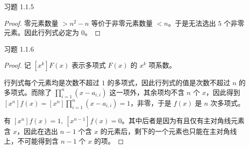 \begin{problem}
	习题 1.1.5
	\begin{proof}
		零元素数量 $> n^2 - n$ 等价于非零元素数量 $< n$。于是无法选出 $5$ 个非零元素。因此行列式必定为 $0$。
	\end{proof}
\end{problem}

\begin{problem}
	习题 1.1.6
	\begin{proof}
		记 $[x^k] F(x)$ 表示多项式 $F(x)$ 的 $x^k$ 项系数。

		行列式每个元素均是次数不超过 $1$ 的多项式，因此行列式的值是次数不超过 $n$ 的多项式。而除了 $\prod_{i=1}^n (x - a_{i,i})$ 这一项外，其余项均不含 $n$ 个 $x$，因此得到 $[x^n] f(x) = [x^n] \prod_{i=1}^n (x - a_{i,i}) = 1$，非零，于是 $f(x)$ 是 $n$ 次多项式。

		有 $[x^n] f(x) = 1,\ [x^{n-1}] f(x) = 0$。其中后者是因为有且仅有主对角线元素含 $x$，因此在选出 $n-1$ 个含 $x$ 的元素后，剩下的一个元素也只能在主对角线上，不可能得到含 $n-1$ 个 $x$ 的项。
	\end{proof}
\end{problem}
